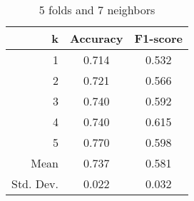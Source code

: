 \begin{table}
\centering
\caption{5 folds and 7 neighbors}
\begin{tabular}{rcc}
\toprule
         k &  Accuracy &  F1-score \\
\midrule
         1 &     0.714 &     0.532 \\
         2 &     0.721 &     0.566 \\
         3 &     0.740 &     0.592 \\
         4 &     0.740 &     0.615 \\
         5 &     0.770 &     0.598 \\
      Mean &     0.737 &     0.581 \\
 Std. Dev. &     0.022 &     0.032 \\
\bottomrule
\end{tabular}
\end{table}
